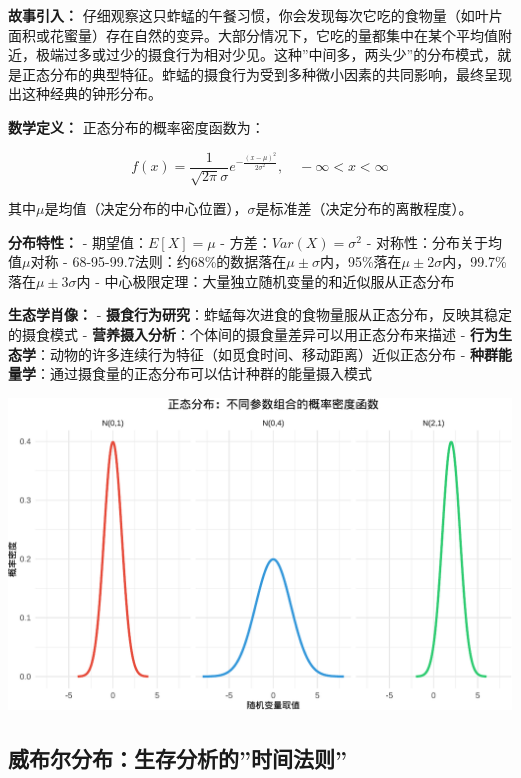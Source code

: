 \documentclass[
]{book}
\begin{document}
\textbf{故事引入：} 仔细观察这只蚱蜢的午餐习惯，你会发现每次它吃的食物量（如叶片面积或花蜜量）存在自然的变异。大部分情况下，它吃的量都集中在某个平均值附近，极端过多或过少的摄食行为相对少见。这种''中间多，两头少''的分布模式，就是正态分布的典型特征。蚱蜢的摄食行为受到多种微小因素的共同影响，最终呈现出这种经典的钟形分布。

\textbf{数学定义：} 正态分布的概率密度函数为：

\[f(x) = \frac{1}{\sqrt{2\pi}\sigma} e^{-\frac{(x-\mu)^2}{2\sigma^2}}, \quad -\infty < x < \infty\]

其中\(\mu\)是均值（决定分布的中心位置），\(\sigma\)是标准差（决定分布的离散程度）。

\textbf{分布特性：}
- 期望值：\(E[X] = \mu\)
- 方差：\(Var(X) = \sigma^2\)
- 对称性：分布关于均值\(\mu\)对称
- 68-95-99.7法则：约68\%的数据落在\(\mu \pm \sigma\)内，95\%落在\(\mu \pm 2\sigma\)内，99.7\%落在\(\mu \pm 3\sigma\)内
- 中心极限定理：大量独立随机变量的和近似服从正态分布

\textbf{生态学肖像：}
- \textbf{摄食行为研究}：蚱蜢每次进食的食物量服从正态分布，反映其稳定的摄食模式
- \textbf{营养摄入分析}：个体间的摄食量差异可以用正态分布来描述
- \textbf{行为生态学}：动物的许多连续行为特征（如觅食时间、移动距离）近似正态分布
- \textbf{种群能量学}：通过摄食量的正态分布可以估计种群的能量摄入模式

\begin{center}\includegraphics[width=0.8\linewidth]{ecological-statistics_files/figure-latex/unnamed-chunk-29-1} \end{center}

\hypertarget{ux5a01ux5e03ux5c14ux5206ux5e03ux751fux5b58ux5206ux6790ux7684ux65f6ux95f4ux6cd5ux5219}{%
\subsection{威布尔分布：生存分析的''时间法则''}\label{ux5a01ux5e03ux5c14ux5206ux5e03ux751fux5b58ux5206ux6790ux7684ux65f6ux95f4ux6cd5ux5219}}
\end{document}
